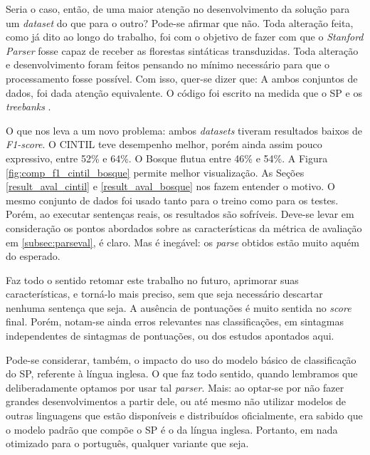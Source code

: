 Seria o caso, então, de uma maior atenção no desenvolvimento da solução para um \textit{dataset} do que para o outro? Pode-se afirmar que não. Toda alteração feita, como já dito ao longo do trabalho, foi com o objetivo de fazer com que o \textit{Stanford Parser} fosse capaz de receber as florestas sintáticas transduzidas. Toda alteração e desenvolvimento foram feitos pensando no mínimo necessário para que o processamento fosse possível. Com isso, quer-se dizer que: A ambos conjuntos de dados, foi dada atenção equivalente.
O código foi escrito na medida que o SP e os \textit{treebanks} .
\begin{center}
    
\end{center}

O que nos leva a um novo problema: ambos \textit{datasets} tiveram resultados baixos de \textit{F1-score}.
O CINTIL teve desempenho melhor, porém ainda assim pouco expressivo, entre 52\% e 64\%. O Bosque flutua entre 46\% e 54\%.
A Figura \ref{fig:comp_f1_cintil_bosque} permite melhor visualização.
As Seções \ref{result_aval_cintil} e \ref{result_aval_bosque} nos fazem entender o motivo. O mesmo conjunto de dados foi usado tanto para o treino como para os testes. Porém, ao executar sentenças reais, os resultados são sofríveis. Deve-se levar em consideração os pontos abordados sobre as características da métrica de avaliação em \ref{subsec:parseval}, é claro. Mas é inegável: os \textit{parse} obtidos estão muito aquém do esperado. 

Faz todo o sentido retomar este trabalho no futuro, aprimorar suas características, e torná-lo mais preciso, sem que seja necessário descartar nenhuma sentença que seja. A ausência de pontuações é muito sentida no \textit{score} final. 
Porém, notam-se ainda erros relevantes nas classificações, em sintagmas independentes de sintagmas de pontuações, ou dos estudos apontados aqui.

Pode-se considerar, também, o impacto do uso do modelo básico de classificação do SP, referente à língua inglesa.
O que faz todo sentido, quando lembramos que deliberadamente optamos por usar tal \textit{parser}. Mais: ao optar-se por não fazer grandes desenvolvimentos a partir dele, ou até mesmo não utilizar modelos de outras linguagens que estão disponíveis e distribuídos oficialmente, era sabido que o modelo padrão que compõe o SP é o da língua inglesa. Portanto, em nada otimizado para o português, qualquer variante que seja. 

